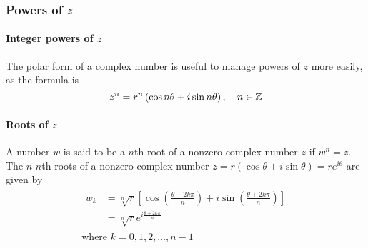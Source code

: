 \documentclass[10pt, twocolumn]{article}
\theoremstyle{definition}
\begin{document}
\subsubsection*{Powers of \(z\)}
\paragraph*{Integer powers of \(z\)}
The polar form of a complex number is useful to manage powers of \(z\) more easily, as the formula is
\[
  z^n = r^n \left( \cos n\theta + i\sin n\theta \right), \quad n \in \mathbb{Z}
\]

\paragraph*{Roots of \(z\)}
A number \(w\) is said to be a \(n\)th root of a nonzero complex number \(z\) if \(w^n = z\).
The \(n\) \(n\)th roots of a nonzero complex number \(z = r(\cos\theta + i\sin\theta) = re^{i\theta}\) are given by
\begin{gather*}
  \begin{aligned}
    w_k & = \sqrt[n]{r}\left[ \cos\left( \frac{\theta + 2k\pi}{n} \right) + i\sin\left( \frac{\theta + 2k\pi}{n} \right) \right] \\
        & = \sqrt[n]{r}e^{i\frac{\theta + 2k\pi}{n}}
  \end{aligned} \\
  \text{where } k = 0, 1, 2, \dots, n - 1
\end{gather*}
\end{document}
